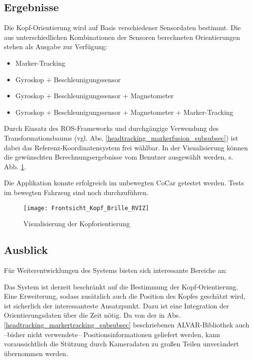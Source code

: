 
\subsection{Ergebnisse}

Die Kopf-Orientierung wird auf Basis verschiedener Sensordaten bestimmt.
Die aus unterschiedlichen Kombinationen der Sensoren berechneten Orientierungen stehen als Ausgabe zur Verfügung:
\begin{itemize}
  \item Marker-Tracking
  \item Gyroskop + Beschleunigungssensor
  \item Gyroskop + Beschleunigungssensor + Magnetometer
  \item Gyroskop + Beschleunigungssensor + Magnetometer + Marker-Tracking
\end{itemize}

Durch Einsatz des \ac{ROS}-Frameworks und durchgängige Verwendung des Transformationsbaums (vgl. Abs. \ref{headtracking_markerfusion_subsubsec}) ist dabei das Referenz-Koordinatensystem frei wählbar.
In der Visualisierung können die gewünschten Berechnungsergebnisse vom Benutzer ausgewählt werden, s. Abb. \ref{fig:kopf_orientierung_rviz}.


Die Applikation konnte erfolgreich im unbewegten CoCar getestet werden.
Tests im bewegten Fahrzeug sind noch durchzuführen.


\begin{figure}
  \centering
  \texttt{[image: Frontsicht\_Kopf\_Brille\_RVIZ]}
  \caption{Visualisierung der Kopforientierung}
  \label{fig:kopf_orientierung_rviz}
\end{figure}


\subsection{Ausblick}


Für Weiterentwicklungen des Systems bieten sich interessante Bereiche an:

Das System ist derzeit beschränkt auf die Bestimmung der Kopf-Orientierung.
Eine Erweiterung, sodass zusätzlich auch die Position des Kopfes geschätzt wird, ist sicherlich der interessanteste Ansatzpunkt.
Dazu ist eine Integration der Orientierungsdaten über die Zeit nötig.
Da von der in Abs. \ref{headtracking_markertracking_subsubsec} beschriebenen ALVAR-Bibliothek auch --bisher nicht verwendete-- Positionsinformationen geliefert werden, kann voraussichtlich die Stützung durch Kameradaten zu großen Teilen unverändert übernommen werden.


